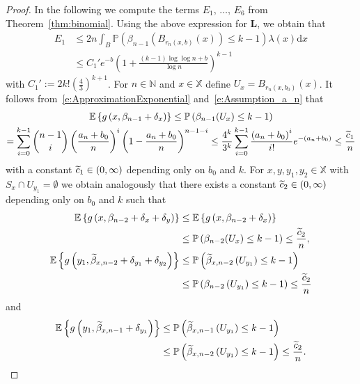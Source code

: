 \documentclass[AHL,Unicode,longabstracts]{cedram}
\newcommand*\bL{\mathbf{L}}
\newcommand*\N{\mathbb{N}}
\renewcommand*\P{\mathbb{P}}
\newcommand*\X{\mathbb{X}}
\newcommand{\E}{\mathbb{E}}
\newcommand*\md{\mathrm{d}}
\newcommand{\mean}[1] {\E\left\{{#1}\right\}}
\newcommand{\param}[1]{\left(#1\right)}
\newcommand{\prob}[1]{\P\left(#1\right)}
\let\oldtilde\tilde
\renewcommand*{\tilde}[1]{\mathchoice{\widetilde{#1}}{\widetilde{#1}}{\oldtilde{#1}}{\oldtilde{#1}}}
\begin{document}
\begin{proof}
In the following we compute the terms $E_1,\,\hdots,\,E_6$ from Theorem~\ref{thm:binomial}. Using the above expression for $\bL$, we obtain that
\begin{equation}\label{e:E1bin}
\begin{split}
E_1 & \leq 2n \int_B \prob{ \beta_{n-1}\left(B_{r_n(x,b)}(x)\right)\leq k-1} \lambda(x) \md x \\
&\leq C_1' e^{-b}\param{1 + \frac{(k-1)\log \log n +b}{\log n}}^{k-1}
\end{split}
\end{equation}
with $C_1':=2k! (\tfrac{4}{3})^{k+1}$. For $n\in\N$ and $x\in\X$ define $U_{x}=B_{r_n(x,b_0)}(x)$. It follows from~\eqref{e:ApproximationExponential} and~\eqref{e:Assumption_a_n} that
\begin{multline}\label{e:gbetan-1}
\mean{g\left(x,\beta_{n-1}+\delta_x\right)} \leq \prob{\beta_{n-1}(U_x)\leq k-1}\\
= \sum_{i=0}^{k-1} \binom{n-1}{i} \left(\frac{a_n+b_0}{n} \right)^i \left(1-\frac{a_n+b_0}{n} \right)^{n-1-i} 
 \leq \frac{4^k}{3^k} \sum_{i=0}^{k-1} \frac{\left(a_n+b_0\right)^i}{i!} e^{-\left(a_n+b_0\right)} \leq \frac{\tilde{c}_1}{n}
\end{multline}
with a constant $\tilde{c}_1\in(0,\infty)$ depending only on $b_0$ and $k$. For $x,y,y_1,y_2\in\X$ with $S_x\cap U_{y_1}=\emptyset$ we obtain analogously that there exists a constant $\tilde{c}_2\in(0,\infty)$ depending only on $b_0$ and $k$ such that
\begin{align}
\mean{g\left(x,\beta_{n-2}+\delta_x+\delta_y\right)} & \leq \mean{g\left(x,\beta_{n-2}+\delta_x\right)}\label{e:gbetan-2}\\
 &\leq \prob{\beta_{n-2}(U_x)\leq k-1} \leq \frac{\tilde{c}_2}{n},\nonumber\\
\mean{g\left(y_1,\widetilde{\beta}_{x,n-2}+\delta_{y_1}+\delta_{y_2}\right)} & \leq \prob{\widetilde{\beta}_{x,n-2}\left(U_{y_1}\right)\leq k-1}\label{e:gtildebetan-2}\\
 &\leq \prob{\beta_{n-2}\left(U_{y_1}\right)\leq k-1} \leq \frac{\tilde{c}_2}{n}\nonumber
\end{align}
and
\begin{equation}\label{e:gtildebetan-1}
\begin{split}
\mean{g\left(y_1,\widetilde{\beta}_{x,n-1}+\delta_{y_1}\right)} &\leq \prob{\widetilde{\beta}_{x,n-1}\left(U_{y_1}\right)\leq k-1}\\
&\leq \prob{\widetilde{\beta}_{x,n-2}\left(U_{y_1}\right)\leq k-1} \leq \frac{\tilde{c}_2}{n}.

\end{split}
\end{equation}
\end{proof}
\end{document}
